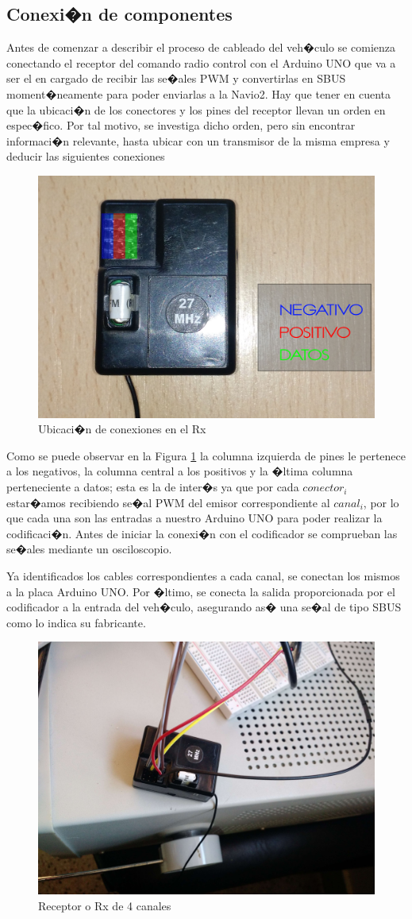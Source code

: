 	\subsection{Conexi�n de componentes}
		
		Antes de comenzar a describir el proceso de cableado del veh�culo se comienza conectando el receptor del comando radio control con el Arduino UNO que va a ser el en cargado de recibir las se�ales PWM y convertirlas en SBUS moment�neamente para poder enviarlas a la Navio2. Hay que tener en cuenta que la ubicaci�n de los conectores y los pines del receptor llevan un orden en espec�fico. Por tal motivo, se investiga dicho orden, pero sin encontrar informaci�n relevante, hasta ubicar con un transmisor de la misma empresa y deducir las siguientes conexiones
		
		
		\begin{figure}[h!]
		\centering
		\includegraphics[width=0.5\linewidth, height=0.3\textheight]{Imagenes/fotos/Rxconexion}
		\caption{Ubicaci�n de conexiones en el Rx}
		\label{fig:RxConexiones}
		\end{figure}
		
		Como se puede observar en la Figura \ref{fig:RxConexiones} la columna izquierda de pines le pertenece a los negativos, la columna central a los positivos y la �ltima columna perteneciente a datos; esta es la de inter�s ya que por cada $conector_i$ estar�amos recibiendo se�al PWM del emisor correspondiente al $canal_i$, por lo que cada una son las entradas a nuestro Arduino UNO para poder realizar la codificaci�n. Antes de iniciar la conexi�n con el codificador se comprueban las se�ales mediante un osciloscopio. 
		\par Ya identificados los cables correspondientes a cada canal, se conectan los mismos a la placa Arduino UNO. Por �ltimo, se conecta la salida proporcionada por el codificador a la entrada del veh�culo, asegurando as� una se�al de tipo SBUS como lo indica su fabricante.
		
		\begin{figure}[h!]
		\centering
		\includegraphics[width=0.5\linewidth, height=0.3\textheight]{Imagenes/fotos/rc_receptor}
		\caption{Receptor o Rx de 4 canales}
		\label{fig:rc_receptor}
		\end{figure}
		
